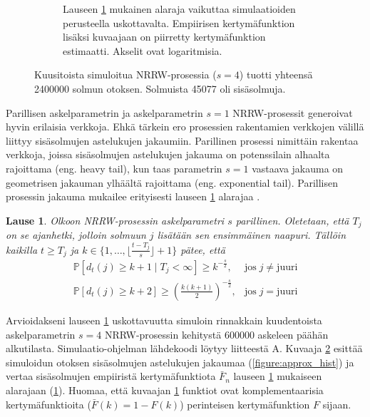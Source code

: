 \documentclass[finnish, 12pt, a4paper, sci, utf8, pdfa]{aaltothesis}
\newcommand*{\prob}{\mathbb{P}}
\newtheorem{theorem}{Lause}
\begin{document}
\begin{figure}[htb]
\begin{subfigure}[b]{0.47\textwidth}
      \caption{Lauseen \ref{theorem:asteluku} mukainen alaraja vaikuttaa simulaatioiden perusteella uskottavalta. Empiirisen kertymäfunktion lisäksi kuvaajaan on piirretty kertymäfunktion estimaatti. Akselit ovat logaritmisia. \label{figure:approx_cdf}}
   \end{subfigure}
   \caption{Kuusitoista simuloitua NRRW-prosessia ($ s = 4 $) tuotti yhteensä 2400000 solmun otoksen. Solmuista 45077 oli sisäsolmuja.}
   \label{figure:asteluku-sim}
\end{figure}

Parillisen askelparametrin ja askelparametrin $ s = 1 $ NRRW-prosessit generoivat hyvin erilaisia verkkoja. Ehkä tärkein ero prosessien rakentamien verkkojen välillä liittyy sisäsolmujen
astelukujen jakaumiin. Parillinen prosessi nimittäin rakentaa verkkoja, joissa sisäsolmujen astelukujen jakauma on potenssilain alhaalta rajoittama (eng. heavy tail), kun taas parametrin $ s = 1 $ vastaava jakauma on geometrisen jakauman ylhäältä rajoittama (eng. exponential tail). Parillisen prosessin jakauma mukailee erityisesti lauseen \ref{theorem:asteluku} alarajaa \cite{Iacobelli}.

\begin{theorem}
   Olkoon NRRW-prosessin askelparametri $ s $ parillinen. Oletetaan, että $ T_{j} $ on se ajanhetki, jolloin solmuun $ j $ lisätään sen ensimmäinen naapuri. Tällöin kaikilla $ t \geq T_{j} $ ja $ k \in \{1,\ldots,\lfloor \frac{t-T_{j}}{s} \rfloor + 1\} $ pätee, että
   \[
      \renewcommand{\arraystretch}{2.0}
      \begin{array}{lr}
         \prob \left[ d_{t}(j) \geq k + 1 \mid T_{j} < \infty \right] \geq k^{-\frac{s}{2}},             & \text{jos} \; j \neq \text{juuri} \\
         \prob \left[ d_{t}(j) \geq k + 2 \right] \geq \left( \frac{k(k+1)}{2} \right)^{-\frac{s}{2}},   & \text{jos} \; j = \text{juuri}
      \end{array}
   \]
   \label{theorem:asteluku}
\end{theorem}
Arvioidakseni lauseen \ref{theorem:asteluku} uskottavuutta simuloin rinnakkain kuudentoista askelparametrin $ s = 4 $ NRRW-prosessin kehitystä 600000 askeleen päähän alkutilasta. 
Simulaatio-ohjelman lähdekoodi löytyy liitteestä A. Kuvaaja \ref{figure:asteluku-sim} esittää simuloidun otoksen sisäsolmujen astelukujen jakaumaa (\ref{figure:approx_hist}) ja 
vertaa sisäsolmujen empiiristä kertymäfunktiota $ \bar{F}_{n} $ lauseen \ref{theorem:asteluku} mukaiseen alarajaan (\ref{figure:approx_cdf}). Huomaa, että kuvaajan \ref{figure:approx_cdf}
funktiot ovat komplementaarisia kertymäfunktioita ($ \bar{F}(k) = 1 - F(k) $) perinteisen kertymäfunktion $ F $ sijaan. 
\end{document}
